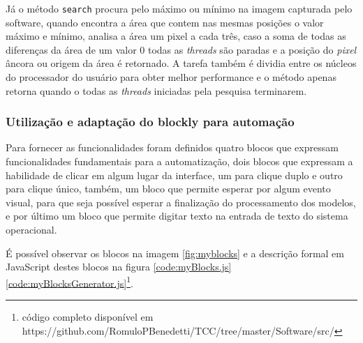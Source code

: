 \documentclass[tg]{mdtufsm}
\begin{document}
                    Já o método \texttt{search} procura pelo máximo ou mínimo na imagem capturada pelo software, quando encontra a área que contem nas mesmas posições o valor máximo e mínimo, analisa a área um pixel a cada três, caso a soma de todas as diferenças da área de um valor 0 todas as \emph{threads} são paradas e a posição do \emph{pixel} âncora ou origem da área é retornado. A tarefa também é dividia entre os núcleos do processador do usuário para obter melhor performance e o método apenas retorna quando o todas as \emph{threads} iniciadas pela pesquisa terminarem.

                \subsubsection {Utilização e adaptação do blockly para automação}

                    Para fornecer as funcionalidades foram definidos quatro blocos que expressam funcionalidades fundamentais para a automatização, dois blocos que expressam a habilidade de clicar em algum lugar da interface, um para clique duplo e outro para clique único, também, um bloco que permite esperar por algum evento visual, para que seja possível esperar a finalização do processamento dos modelos, e por último um bloco que permite digitar texto na entrada de texto do sistema operacional.

                    É possível observar os blocos na imagem \ref{fig:myblocks} e a descrição formal em JavaScript destes blocos na figura \ref{code:myBlocks.js}\ref{code:myBlocksGenerator.js}\footnote{código completo disponível em https://github.com/RomuloPBenedetti/TCC/tree/master/Software/src/}.
\end{document}
